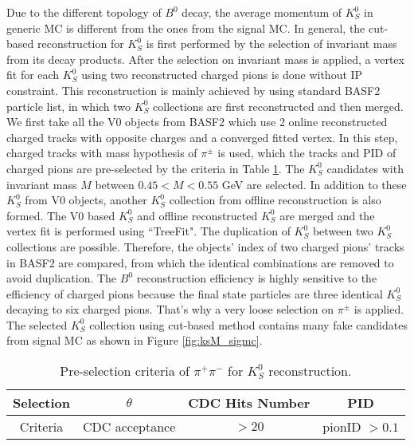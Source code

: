 Due to the different topology of $B^0$ decay, the average momentum of $K_S^0$ in generic MC is different from the ones from the signal MC. In general, the cut-based reconstruction for $K_S^0$ is first performed by the selection of invariant mass from its decay products. After the selection on invariant mass is applied, a vertex fit for each $K_S^0$ using two reconstructed charged pions is done without IP constraint. This reconstruction is mainly achieved by using standard BASF2 particle list, in which two $K_S^0$ collections are first reconstructed and then merged. We first take all the V0 objects from BASF2 which use 2 online reconstructed charged tracks with opposite charges and a converged fitted vertex. In this step, charged tracks with mass hypothesis of $\pi^{\pm}$ is used, which the tracks and PID of charged pions are pre-selected by the criteria in Table \ref{tab:kspipi_select}. The $K_S^0$ candidates with invariant mass $M$ between $0.45 < M < 0.55$ GeV are selected. In addition to these $K_S^0$ from V0 objects, another $K_S^0$ collection from offline reconstruction is also formed. The V0 based $K_S^0$ and offline reconstructed $K_S^0$ are merged and the vertex fit is performed using ``TreeFit"\cite{krohn2020global}. The duplication of $K_S^0$ between two $K_S^0$ collections are possible. Therefore, the objects' index of two charged pions' tracks in BASF2 are compared, from which the identical combinations are removed to avoid duplication. The $B^0$ reconstruction efficiency is highly sensitive to the efficiency of charged pions because the final state particles are three identical $K_S^0$ decaying to six charged pions. That's why a very loose selection on $\pi^{\pm}$ is applied. The selected $K_S^0$ collection using cut-based method contains many fake candidates from signal MC as shown in Figure \ref{fig:ksM_sigmc}.
\begin{table}[htbp]
	\centering
	\large
	\caption{Pre-selection criteria of $\pi^+ \pi^-$ for $K_S^0$ reconstruction.}
	\label{tab:kspipi_select}
	\begin{tabular}{c c c c }
		\toprule
		Selection & $\theta$ & CDC Hits Number & PID  \\
		\hline
		Criteria  & CDC acceptance &  $>20$ & pionID $> 0.1$\\
		\bottomrule
	\end{tabular}
\end{table}

